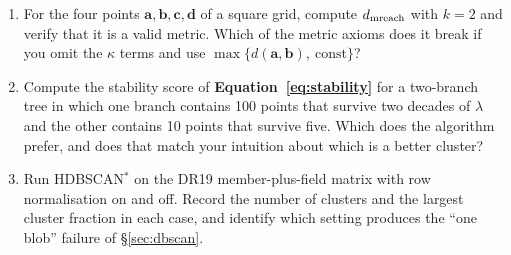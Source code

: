 \begin{issues}[EXERCISES]
\begin{enumerate}
\item For the four points $\mathbf{a},\mathbf{b},\mathbf{c},\mathbf{d}$ of a
  square grid, compute $d_{\rm mreach}$ with $k=2$ and verify that it is a
  valid metric. Which of the metric axioms does it break if you omit the
  $\kappa$ terms and use $\max\{d(\mathbf{a},\mathbf{b}),\ \text{const}\}$?
\item Compute the stability score of \textbf{Equation~\ref{eq:stability}} for
  a two-branch tree in which one branch contains 100 points that survive two
  decades of $\lambda$ and the other contains 10 points that survive five.
  Which does the algorithm prefer, and does that match your intuition about
  which is a better cluster?
\item Run HDBSCAN$^*$ on the DR19 member-plus-field matrix with row
  normalisation on and off. Record the number of clusters and the largest
  cluster fraction in each case, and identify which setting produces the
  ``one blob'' failure of \S\ref{sec:dbscan}.
\end{enumerate}
\end{issues}

